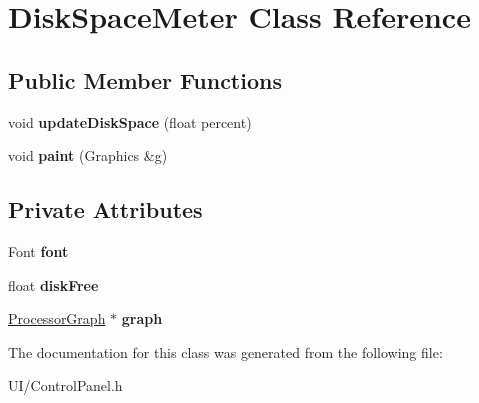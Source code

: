\hypertarget{classDiskSpaceMeter}{\section{Disk\-Space\-Meter Class Reference}
\label{classDiskSpaceMeter}
}
\subsection*{Public Member Functions}
\begin{DoxyCompactItemize}
\item 
\hypertarget{classDiskSpaceMeter_acc3483e3a49b12a9c5dd13568c98aeec}{void {\bfseries update\-Disk\-Space} (float percent)}\label{classDiskSpaceMeter_acc3483e3a49b12a9c5dd13568c98aeec}

\item 
\hypertarget{classDiskSpaceMeter_a11df895ab492661e07e3b6c4393c75b2}{void {\bfseries paint} (Graphics \&g)}\label{classDiskSpaceMeter_a11df895ab492661e07e3b6c4393c75b2}

\end{DoxyCompactItemize}
\subsection*{Private Attributes}
\begin{DoxyCompactItemize}
\item 
\hypertarget{classDiskSpaceMeter_a8f740abddda096f2d51f289f2bf995af}{Font {\bfseries font}}\label{classDiskSpaceMeter_a8f740abddda096f2d51f289f2bf995af}

\item 
\hypertarget{classDiskSpaceMeter_a1174c651208caa6c7528a948cb4b4514}{float {\bfseries disk\-Free}}\label{classDiskSpaceMeter_a1174c651208caa6c7528a948cb4b4514}

\item 
\hypertarget{classDiskSpaceMeter_aa0cfc8c37918982d8ddee518e91d7565}{\hyperlink{classProcessorGraph}{Processor\-Graph} $\ast$ {\bfseries graph}}\label{classDiskSpaceMeter_aa0cfc8c37918982d8ddee518e91d7565}

\end{DoxyCompactItemize}


The documentation for this class was generated from the following file\-:\begin{DoxyCompactItemize}
\item 
U\-I/Control\-Panel.\-h\end{DoxyCompactItemize}
